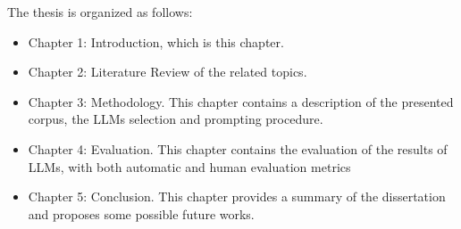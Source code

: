 The thesis is organized as follows:
\begin{itemize}
    \item Chapter 1: Introduction, which is this chapter.
    \item Chapter 2: Literature Review of the related topics.
    \item Chapter 3: Methodology. This chapter contains a description of the presented corpus, the LLMs selection and prompting procedure.
    \item Chapter 4: Evaluation. This chapter contains the evaluation of the results of LLMs, with both automatic and human evaluation metrics
    \item Chapter 5: Conclusion. This chapter provides a summary of the dissertation and proposes some possible future works.
\end{itemize}


